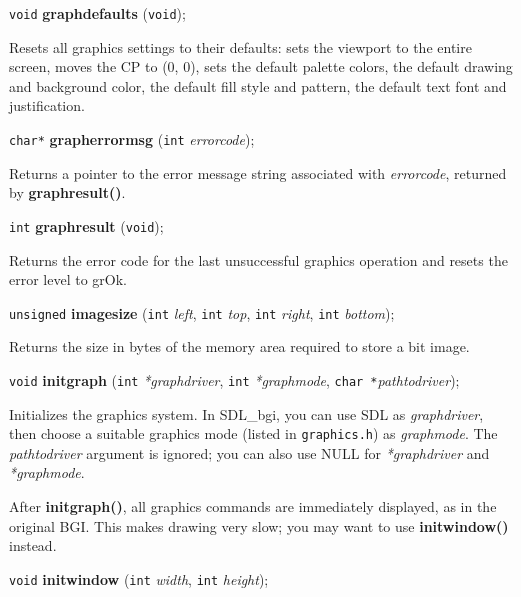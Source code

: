 \documentclass[a4paper,11pt]{article}
\newcommand{\SDLbgi}{SDL\_bgi}
\newcommand{\V}{\texttt{void}}      %
\newcommand{\I}{\texttt{int}}       %
\newcommand{\C}{\texttt{char *}}    %
\newcommand{\func}[1]{\textbf{#1}}  %
\newcommand{\A}[1]{\emph{#1}}       %
\newcommand{\F}[1]{\texttt{#1}}     %
\newenvironment{bgi}
{ %
  \begin{snugshade}
}
{ %
  \end{snugshade}
}
\begin{document}
\begin{bgi}
\V{} \func{graphdefaults} (\V{});
\end{bgi}

Resets all graphics settings to their defaults: sets the viewport to
the entire screen, moves the CP to (0, 0), sets the default palette
colors, the default drawing and background color, the default fill
style and pattern, the default text font and justification.


\begin{bgi}
\texttt{char*} \func{grapherrormsg} (\I{} \A{errorcode});
\end{bgi}

Returns a pointer to the error message string associated with
\A{errorcode}, returned by \func{graphresult()}.


\begin{bgi}
\I{} \func{graphresult} (\V{});
\end{bgi}

Returns the error code for the last unsuccessful graphics operation
and resets the error level to grOk.


\begin{bgi}
\texttt{unsigned} \func{imagesize} (\I{} \A{left}, \I{} \A{top}, \I{}
\A{right}, \I{} \A{bottom});
\end{bgi}

Returns the size in bytes of the memory area required to store a bit
image.


\begin{bgi}
\V{} \func{initgraph} (\I{} \A{*graphdriver}, \I{} \A{*graphmode},
\C{}\A{pathtodriver});
\end{bgi}

Initializes the graphics system. In \SDLbgi, you can use SDL as
\A{graphdriver}, then choose a suitable graphics mode (listed in
\F{graphics.h}) as \A{graphmode}. The \A{pathtodriver} argument is
ignored; you can also use NULL for \A{*graphdriver} and
\A{*graphmode}.

After \func{initgraph()}, all graphics commands are immediately
displayed, as in the original BGI. This makes drawing very slow; you
may want to use \func{initwindow()} instead.


\begin{bgi}
\V{} \func{initwindow} (\I{} \A{width}, \I{} \A{height});
\end{bgi}
\end{document}
